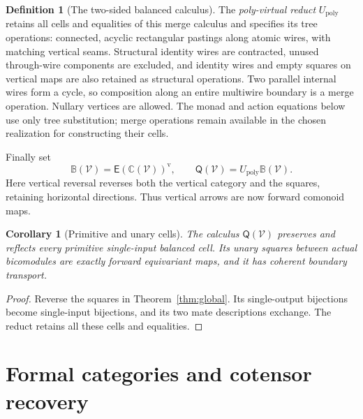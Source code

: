 \documentclass[11pt,a4paper]{article}
\newtheorem{corollary}[theorem]{Corollary}
\theoremstyle{definition}
\newtheorem{definition}[theorem]{Definition}
\theoremstyle{remark}
\numberwithin{equation}{section}
\newcommand{\V}{\mathcal V}
\newcommand{\Ccal}{\mathbb C}
\newcommand{\Bcal}{\mathbb B}
\newcommand{\Ecal}{\mathsf E}
\newcommand{\Q}{\mathsf Q}
\newcommand{\Up}{U_{\mathrm{poly}}}
\begin{document}
\begin{definition}[The two-sided balanced calculus]\label{def:Q}
The \emph{poly-virtual reduct} $\Up$ retains all cells and equalities of
this merge calculus and specifies its tree operations: connected,
acyclic rectangular pastings along atomic wires, with matching vertical
seams. Structural identity wires are contracted, unused through-wire
components are excluded, and identity wires and empty squares on
vertical maps are also retained as structural operations. Two parallel
internal wires form a cycle, so composition along an entire multiwire
boundary is a merge operation. Nullary vertices are allowed. The monad
and action equations below use only tree substitution; merge operations
remain available in the chosen realization for constructing their cells.

Finally set
\begin{equation}\label{eq:Q}
\Bcal(\V)=\Ecal(\Ccal(\V))^{\mathrm v},
\qquad
\Q(\V)=\Up\Bcal(\V).
\end{equation}
Here vertical reversal reverses both the vertical category and the
squares, retaining horizontal directions. Thus vertical arrows are now
forward comonoid maps.
\end{definition}

\begin{corollary}[Primitive and unary cells]\label{cor:unary}
The calculus $\Q(\V)$ preserves and reflects every primitive
\emph{single-input} balanced cell. Its unary squares between actual
bicomodules are exactly forward equivariant maps, and it has coherent
boundary transport.
\end{corollary}
\begin{proof}
Reverse the squares in Theorem~\ref{thm:global}. Its single-output
bijections become single-input bijections, and its two mate descriptions
exchange. The reduct retains all these cells and equalities.
\end{proof}

\section{Formal categories and cotensor recovery}\label{sec:categories}
\end{document}
